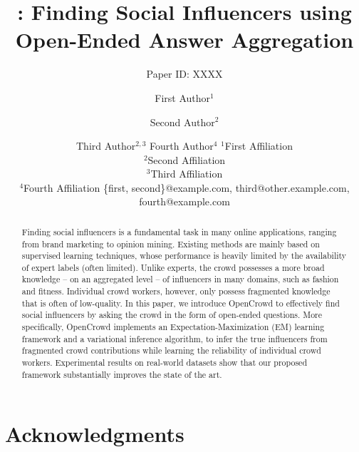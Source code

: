 \documentclass{article}
\title{\sys: Finding Social Influencers using Open-Ended Answer Aggregation}
\author{
Paper ID: XXXX
}
\author{
First Author$^1$
\and
Second Author$^2$\and
Third Author$^{2,3}$\And
Fourth Author$^4$
\affiliations
$^1$First Affiliation\\
$^2$Second Affiliation\\
$^3$Third Affiliation\\
$^4$Fourth Affiliation
\emails
\{first, second\}@example.com,
third@other.example.com,
fourth@example.com
}
\newcommand{\sys}{OpenCrowd\xspace}
\begin{document}
\maketitle

\begin{abstract}
Finding social influencers is a fundamental task in many online applications, ranging from brand
marketing to opinion mining. Existing methods are mainly based on supervised learning techniques,
whose performance is heavily limited by the availability of expert labels (often limited). Unlike
experts, the crowd possesses a more broad knowledge -- on an aggregated level -- of
influencers in many domains, such as fashion and fitness. Individual crowd workers, however, only
possess fragmented knowledge that is often of low-quality. In this paper, we introduce \sys to
effectively find social influencers by asking the crowd in the form of open-ended questions. More
specifically, \sys implements an Expectation-Maximization (EM) learning framework and a variational
inference algorithm,  to infer the true influencers from fragmented crowd
contributions while learning the reliability of individual crowd workers. Experimental results on
real-world datasets show that our proposed framework substantially improves the state of the art.
\end{abstract}





\label{sec:intro}


\label{sec:related}


\label{sec:method}


\label{sec:result}


\label{sec:conclusion}




\section*{Acknowledgments}





\end{document}
